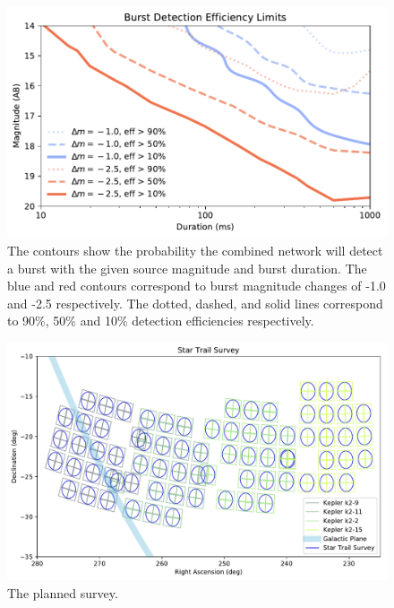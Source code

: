 \documentclass[11pt]{article}
\begin{document}
\begin{figure}[htb]
\center
\includegraphics{f7.pdf}
\caption{The contours show the probability the combined network will detect a burst with the given source magnitude and burst duration. The blue and red contours correspond to burst magnitude changes of -1.0 and -2.5 respectively. The dotted, dashed, and solid lines correspond to 90\%, 50\% and 10\% detection efficiencies respectively.}
\label{fig:1}
\end{figure}

\begin{figure}[htb]
\center
\includegraphics[scale=0.7]{survey.pdf}
\caption{The planned survey.}
\label{fig:3}
\end{figure}


\clearpage

%

%
\end{document}
